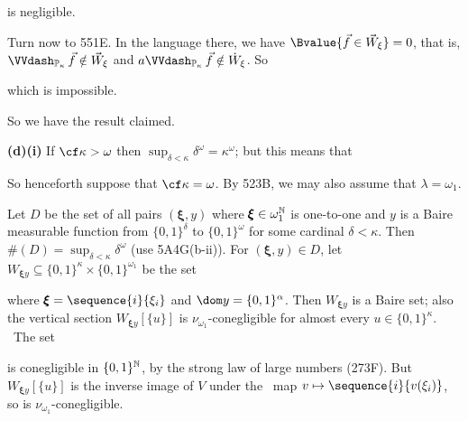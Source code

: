 {

\noindent is negligible.\ \Qed

Turn now to 551E.   In the language there, we have
$\Bvalue{\vec f\in\vec W_{\xi}}=0$, that is,
$\VVdPk\,\vec f\notin\vec W_{\xi}$ and $a\VVdPk\,\vec f\notin\dot W_{\xi}$.
So


\noindent which is impossible.\ \Bang

So we have the result claimed.

\medskip

{\bf (d)(i)}
If $\cf\kappa>\omega$ then
$\sup_{\delta<\kappa}\delta^{\omega}=\kappa^{\omega}$;  but
this means that


\noindent
So henceforth suppose that $\cf\kappa=\omega$.   By 523B, we may also
assume that $\lambda=\omega_1$.

\medskip

 Let $D$ be the set of all pairs $(\pmb{\xi},y)$ where
$\pmb{\xi}\in\omega_1^{\Bbb N}$ is one-to-one
and $y$ is a Baire measurable function from
$\{0,1\}^{\delta}$ to $\{0,1\}^{\omega}$ for some cardinal $\delta<\kappa$.
Then $\#(D)=\sup_{\delta<\kappa}\delta^{\omega}$ (use 5A4G(b-ii)).
For $(\pmb{\xi},y)\in D$, let
$W_{\pmb{\xi}y}\subseteq\{0,1\}^{\kappa}\times\{0,1\}^{\omega_1}$
be the set


\noindent where $\pmb{\xi}=\sequence{i}{\xi_i}$ and
$\dom y=\{0,1\}^{\alpha}$.   Then $W_{\pmb{\xi}y}$ is a Baire set;  also
the vertical section
$W_{\pmb{\xi}y}[\{u\}]$ is $\nu_{\omega_1}$-conegligible for almost every
$u\in\{0,1\}^{\kappa}$.   \Prf\ The set


\noindent is conegligible in $\{0,1\}^{\Bbb N}$, by the strong law of large
numbers (273F).   But $W_{\pmb{\xi}y}[\{u\}]$ is the inverse image of $V$
under the \imp\ map $v\mapsto\sequence{i}{v(\xi_i)}$, so is
$\nu_{\omega_1}$-conegligible.\ \Qed

}
